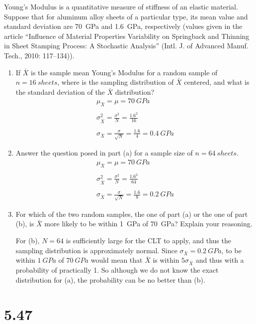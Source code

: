 \documentclass[letterpaper,12pt,fleqn]{article}
\newcommand{\xb}{\bar{X}}
\newcommand{\m}{\mu}
\renewcommand{\o}{\sigma}
\begin{document}
Young's Modulus is a quantitative measure of stiffness of an elastic material.  Suppose that for aluminum alloy sheets of a
particular type, its mean value and standard deviation are \SI{70}{GPa} and \SI{1.6}{GPa}, respectively (values given in the
article ``Influence of Material Properties Variability on Springback and Thinning in Sheet Stamping Process: A Stochastic
Analysis'' (Intl. J. of Advanced Manuf. Tech., 2010: 117--134)).
\begin{enumerate}[label={\alph*)}]
\item If \(\xb\) is the sample mean Young's Modulus for a random sample of \(n=\SI{16}{sheets}\), where is the sampling
  distribution of \(\xb\) centered, and what is the standard deviation of the \(\xb\) distribution?
  \begin{gather*}
    \m_{\xb}=\mu=\SI{70}{GPa} \\
    \\
    \o_{\xb}^2=\frac{\o^2}{N}=\frac{1.6^2}{16} \\
    \\
    \o_{\xb}=\frac{\o}{\sqrt{N}}=\frac{1.6}{4}=\SI{0.4}{GPa}
  \end{gather*}
\item Answer the question posed in part (a) for a sample size of \(n=\SI{64}{sheets}\).
  \begin{gather*}
    \m_{\xb}=\mu=\SI{70}{GPa} \\
    \\
    \o_{\xb}^2=\frac{\o^2}{N}=\frac{1.6^2}{64} \\
    \\
    \o_{\xb}=\frac{\o}{\sqrt{N}}=\frac{1.6}{8}=\SI{0.2}{GPa}
  \end{gather*}
\item For which of the two random samples, the one of part (a) or the one of part (b), is \(\xb\) more likely to be within
  \SI{1}{GPa} of \SI{70}{GPa}?  Explain your reasoning.

  For (b), \(N=64\) is sufficiently large for the CLT to apply, and thus the sampling distribution is approximately normal.
  Since \(\o_{\xb}=\SI{0.2}{GPa}\), to be within \(\SI{1}{GPa}\) of \(\SI{70}{GPa}\) would mean that \(\xb\) is within
  \(5\o_{\xb}\) and thus with a probability of practically 1.  So although we do not know the exact distribution for (a), the
  probability can be no better than (b).
\end{enumerate}

\section*{5.47}
\end{document}

